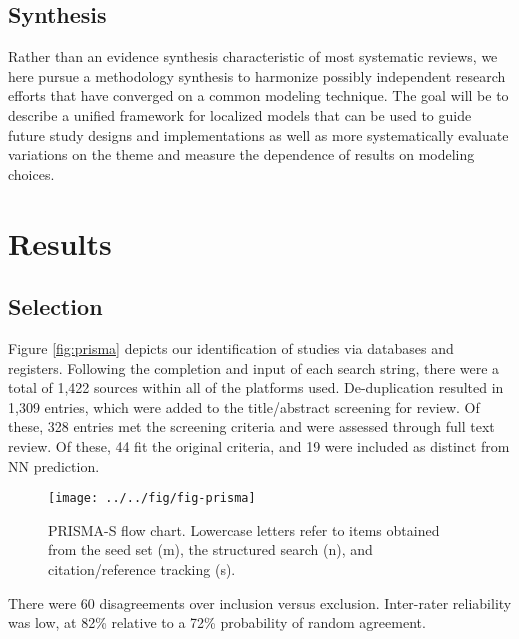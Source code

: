 \documentclass[preprint, 3p,
authoryear]{elsarticle} %
\begin{document}
\hypertarget{synthesis}{%
\subsection{Synthesis}\label{synthesis}}

Rather than an evidence synthesis characteristic of most systematic
reviews, we here pursue a methodology synthesis to harmonize possibly
independent research efforts that have converged on a common modeling
technique. The goal will be to describe a unified framework for
localized models that can be used to guide future study designs and
implementations as well as more systematically evaluate variations on
the theme and measure the dependence of results on modeling choices.

\hypertarget{results}{%
\section{Results}\label{results}}

\hypertarget{selection}{%
\subsection{Selection}\label{selection}}

Figure \ref{fig:prisma} depicts our identification of studies via
databases and registers. Following the completion and input of each
search string, there were a total of 1,422 sources within all of the
platforms used. De-duplication resulted in 1,309 entries, which were
added to the title/abstract screening for review. Of these, 328 entries
met the screening criteria and were assessed through full text review.
Of these, 44 fit the original criteria, and 19 were included as distinct
from NN prediction.

\begin{figure}

{\centering \texttt{[image: ../../fig/fig-prisma]} 

}

\caption{\label{fig:prisma}PRISMA-S flow chart. Lowercase letters refer to items obtained from the seed set (m), the structured search (n), and citation/reference tracking (s).}\label{fig:fig:prisma}
\end{figure}

There were 60 disagreements over inclusion versus exclusion. Inter-rater
reliability was low, at 82\% relative to a 72\% probability of random
agreement.
\end{document}
